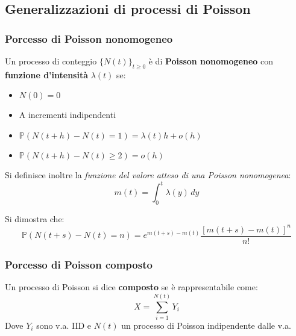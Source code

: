 \subsection{Generalizzazioni di processi di Poisson}
\subsubsection{Porcesso di Poisson nonomogeneo}
\begin{definition}[Poisson 2]
Un processo di conteggio $\{N(t)\}_{t\geq0}$ è di \newline \textbf{Poisson nonomogeneo} con \textbf{funzione d'intensità} $\lambda(t)$ se:
\begin{itemize}
    \item $N(0)=0$
    \item A incrementi indipendenti 
    \item $\mathbb{P}(N(t+h)-N(t)=1)=\lambda(t) h+o(h)$
    \item $\mathbb{P}(N(t+h)-N(t)\geq2)=o(h)$
\end{itemize}
Si definisce inoltre la \textit{funzione del valore atteso di una Poisson nonomogenea}:
\[m(t)=\int_0^t\lambda(y) \,dy\]
\end{definition}

Si dimostra che:
\[\mathbb{P}(N(t+s)-N(t)=n)=e^{m(t+s)-m(t)}\frac{[m(t+s)-m(t)]^n}{n!}\]

\subsubsection{Porcesso di Poisson composto}

Un processo di Poisson si dice \textbf{composto} se è rappresentabile come:
\[X=\sum_{i=1}^{N(t)}Y_i\]
Dove $Y_i$ sono v.a. IID e $N(t)$ un processo di Poisson indipendente dalle v.a.